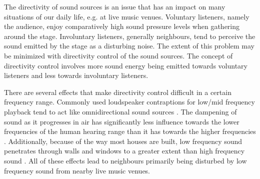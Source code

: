 
The directivity of sound sources is an issue that has an impact on many situations of our daily life, e.g. at live music venues. Voluntary listeners, namely the audience, enjoy comparatively high sound pressure levels when gathering around the stage. Involuntary listeners, generally neighbours, tend to perceive the sound emitted by the stage as a disturbing noise. The extent of this problem may be minimized with directivity control of the sound sources. The concept of directivity control involves more sound energy being emitted towards voluntary listeners and less towards involuntary listeners. 

There are several effects that make directivity control difficult in a certain frequency range. Commonly used loudspeaker contraptions for low/mid frequency playback tend to act like omnidirectional sound sources \citep[p. 1391 f.]{crocker98}.  The dampening of sound as it progresses in air has significantly less influence towards the lower frequencies of the human hearing range than it has towards the higher frequencies \citep[p. 240]{moeser2009}. Additionally, because of the way most houses are built, low frequency sound penetrates through walls and windows to a greater extent than high frequency sound \citep[p. 240 ff.]{moeser2009}. All of these effects lead to neighbours primarily being disturbed by low frequency sound from nearby live music venues.\\

